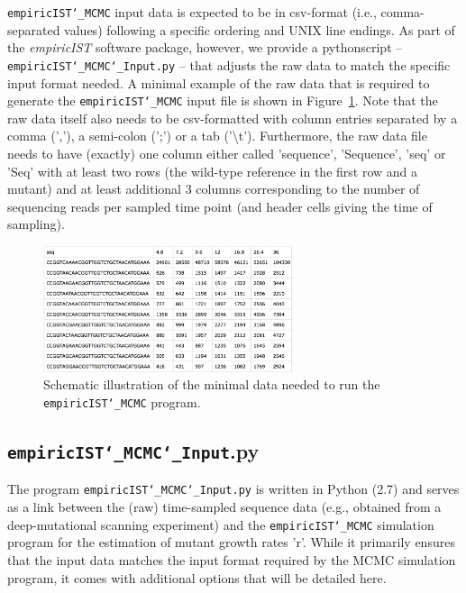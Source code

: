 \documentclass[12pt,a4paper]{scrartcl}
\begin{document}
\texttt{empiricIST\char`_MCMC} input data is expected to be in csv-format (i.e., comma-separated values) following a specific ordering and UNIX line endings. As part of the \emph{empiricIST} software package, however, we provide a python\linebreak script -- \texttt{empiricIST\char`_MCMC\char`_Input.py} -- that adjusts the raw data to match the specific input format needed. A minimal example of the raw data that is required to generate the \texttt{empiricIST\char`_MCMC} input file is shown in Figure~\ref{fig:RawInput}. Note that the raw data itself also needs to be csv-formatted with column entries separated by a comma (','), a semi-colon (';') or a tab ('\textbackslash t').
Furthermore, the raw data file needs to have (exactly) one column either called 'sequence', 'Sequence', 'seq' or 'Seq' with at least two rows (the wild-type reference in the first row and a mutant) and at least additional 3 columns corresponding to the number of sequencing reads per sampled time point (and header cells giving the time of sampling).

\begin{figure}
\centering \includegraphics[width=0.65\textwidth]{RawDataInput.png}
\caption{Schematic illustration of the minimal data needed to run the \texttt{empiricIST\char`_MCMC} program. \label{fig:RawInput}}
\end{figure}

\subsection{\texttt{empiricIST\char`_MCMC\char`_Input}.py}

The program \texttt{empiricIST\char`_MCMC\char`_Input.py} is written in Python (2.7) and serves as a link between the (raw) time-sampled sequence data (e.g., obtained from a deep-mutational scanning experiment) and the \texttt{empiricIST\char`_MCMC} simulation program for the estimation of mutant growth rates 'r'. While it primarily ensures that the input data matches the input format required by the MCMC simulation program, it comes with additional options that will be detailed here.
\end{document}
